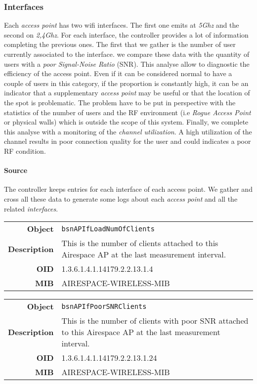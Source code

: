 \subsubsection*{Interfaces}
Each \emph{access point} has two wifi interfaces. The first one emits at \emph{5Ghz} and the second on \emph{2,4Ghz}. For each interface, the controller provides a lot of information completing the previous ones. The first that we gather is the number of user currently associated to the interface. we compare these data with the quantity of users with a \emph{poor Signal-Noise Ratio} (SNR). This analyse allow to diagnostic the efficiency of the access point. Even if it can be considered normal to have a couple of users in this category, if the proportion is constantly high, it can be an indicator that a supplementary \emph{access point} may be useful or that the location of the spot is problematic. The problem have to be put in perspective with the statistics of the number of users and the RF environment (i.e \emph{Rogue Access Point} or physical walls) which is outside the scope of this system. 
Finally, we complete this analyse with a monitoring of the \emph{channel utilization}. A high utilization of the channel results in poor connection quality for the user and could indicates a poor RF condition.

\paragraph*{Source} The controller keeps entries for each interface of each access point. We gather and cross all these data to generate some logs about each \emph{access point} and all the related \emph{interfaces}.

\begin{tabular}{|r l|}
\hline
\textbf{Object} & \texttt{bsnAPIfLoadNumOfClients} \\
\textbf{Description} & \parbox{11cm}{This is the number of clients attached to this Airespace AP at the last measurement interval.} \\
\textbf{OID} & 1.3.6.1.4.1.14179.2.2.13.1.4 \\
\textbf{MIB} & AIRESPACE-WIRELESS-MIB \\
\hline
\end{tabular}

\begin{tabular}{|r l|}
\hline
\textbf{Object} & \texttt{bsnAPIfPoorSNRClients} \\
\textbf{Description} & \parbox{11cm}{This is the number of clients with poor SNR attached to this Airespace AP at the last measurement interval.} \\
\textbf{OID} & 1.3.6.1.4.1.14179.2.2.13.1.24 \\
\textbf{MIB} & AIRESPACE-WIRELESS-MIB \\
\hline
\end{tabular}

